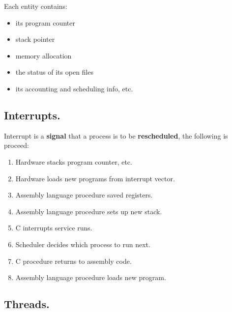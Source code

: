 \documentclass{article}
\begin{document}
Each entity contains:

\begin{itemize}
  \item its program counter
  \item stack pointer
  \item memory allocation 
  \item the status of its open files
  \item its accounting and scheduling info, etc.
\end{itemize}

\subsection*{Interrupts.}
\noindent

Interrupt is a \textbf{signal} that a process is to be \textbf{rescheduled}, the following is proceed:

\begin{enumerate}
  \item Hardware stacks program counter, etc. 
  \item Hardware loads new programs from interrupt vector.
  \item Assembly language procedure saved registers. 
  \item Assembly language procedure sets up new stack.
  \item C interrupts service runs.
  \item Scheduler decides which process to run next.
  \item C procedure returns to assembly code.
  \item Assembly language procedure loads new program.
\end{enumerate}

\subsection*{Threads.}
\noindent
\end{document}
